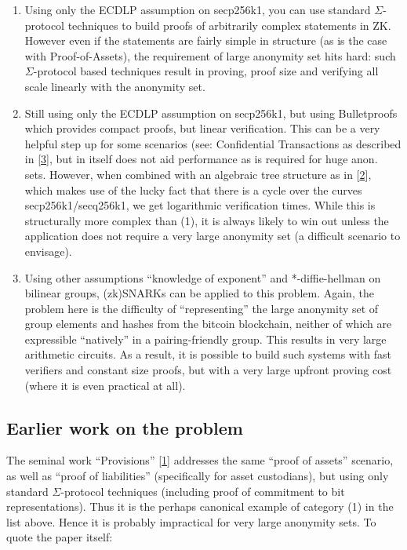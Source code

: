\documentclass[10pt,a4paper]{article}
\begin{document}
\begin{enumerate}
\item Using only the ECDLP assumption on secp256k1, you can use standard $\Sigma$-protocol techniques to build proofs of arbitrarily complex statements in ZK. However even if the statements are fairly simple in structure (as is the case with Proof-of-Assets), the requirement of large anonymity set hits hard: such $\Sigma$-protocol based techniques result in  proving, proof size and verifying all scale linearly with the anonymity set.
\item Still using only the ECDLP assumption on secp256k1, but using Bulletproofs which provides compact proofs, but linear verification. This can be a very helpful step up for some scenarios (see: Confidential Transactions as described in {[}\protect\hyperlink{anchor-3}{3}{]}, but in itself does not aid performance as is required for huge anon. sets. However, when combined with an algebraic tree structure as in {[}\protect\hyperlink{anchor-2}{2}{]}, which makes use of the lucky fact that there is a cycle over the curves secp256k1/secq256k1, we get logarithmic verification times. While this is structurally more complex than (1), it is always likely to win out unless the application does not require a very large anonymity set (a difficult scenario to envisage).
\item Using other assumptions ``knowledge of exponent'' and *-diffie-hellman on bilinear groups, (zk)SNARKs can be applied to this problem. Again, the problem here is the difficulty of ``representing'' the large anonymity set of group elements and hashes from the bitcoin blockchain, neither of which are expressible ``natively'' in a pairing-friendly group. This results in very large arithmetic circuits. As a result, it is possible to build such systems with fast verifiers and constant size proofs, but with a very large upfront proving cost (where it is even practical at all).
\end{enumerate}

\subsection{Earlier work on the problem}

The seminal work ``Provisions'' {[}\protect\hyperlink{anchor-1}{1}{]} addresses the same ``proof of assets'' scenario, as well as ``proof of liabilities'' (specifically for asset custodians), but using only standard $\Sigma$-protocol techniques (including proof of commitment to bit representations). Thus it is the perhaps canonical example of category (1) in the list above. Hence it is probably impractical for very large anonymity sets. To quote the paper itself:
\end{document}
